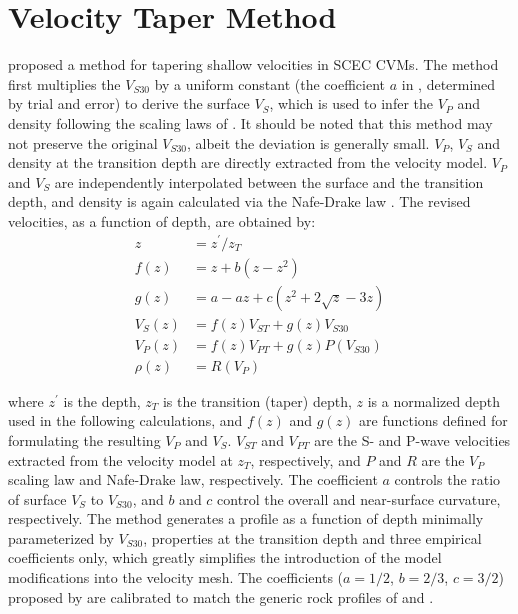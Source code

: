 \section{Velocity Taper Method}
\citet{elyVs30derivedNearsurfaceSeismic2010} proposed a method for tapering shallow velocities in SCEC CVMs. The method first multiplies the $V_{S30}$ by a uniform constant (the coefficient $a$ in , determined by trial and error) to derive the surface $V_S$, which is used to infer the $V_P$ and density following the scaling laws of \citet{brocherEmpiricalRelationsElastic2005}. It should be noted that this method may not preserve the original $V_{S30}$, albeit the deviation is generally small. $V_P$, $V_S$ and density at the transition depth are directly extracted from the velocity model. $V_P$ and $V_S$ are independently interpolated between the surface and the transition depth, and density is again calculated via the Nafe-Drake law \citep{ludwigSeismicRefraction1970}. The revised velocities, as a function of depth, are obtained by:
\begin{equation}\label{eq:vs30-2}
  \begin{aligned}
    z        & = z^{\prime} / z_{T}                       \\
    f(z)     & = z+b\left(z-z^{2}\right)                  \\
    g(z)     & = a-a z+c\left(z^{2}+2 \sqrt{z}-3 z\right) \\
    V_{S}(z) & = f(z) V_{S T}+g(z) V_{S 30}               \\
    V_{P}(z) & = f(z) V_{P T}+g(z) P\left(V_{S 30}\right) \\
    \rho(z)  & = R\left(V_{P}\right)
  \end{aligned}
\end{equation}

\noindent where $z^{\prime}$ is the depth, $z_T$ is the transition (taper) depth, $z$ is a normalized depth used in the following calculations, and $f(z)$ and $g(z)$ are functions defined for formulating the resulting $V_P$ and $V_S$. $V_{ST}$ and $V_{PT}$ are the S- and P-wave velocities extracted from the velocity model at $z_T$, respectively, and $P$ and $R$ are the \citet{brocherEmpiricalRelationsElastic2005} $V_P$ scaling law and Nafe-Drake law, respectively. The coefficient $a$ controls the ratio of surface $V_S$ to $V_{S30}$, and $b$ and $c$ control the overall and near-surface curvature, respectively. The method generates a profile as a function of depth minimally parameterized by $V_{S30}$, properties at the transition depth and three empirical coefficients only, which greatly simplifies the introduction of the model modifications into the velocity mesh. The coefficients ($a=1 \slash 2$, $b=2 \slash 3$, $c=3 \slash 2$) proposed by \citet{elyVs30derivedNearsurfaceSeismic2010} are calibrated to match the generic rock profiles of \citet{booreSiteAmplificationsGeneric1997} and \citet{magistraleSCECSouthernCalifornia2000}.

